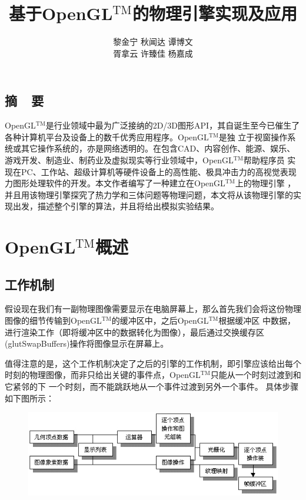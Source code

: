 ﻿\documentclass{article}
\newcommand{\kai}{\CJKfamily{KaiTi}}
\renewenvironment{abstract}{
\subsection*{\textbf{摘~~要}}
\kai
}{}
\begin{document}
	\title{\textbf{基于OpenGL$^{\text{TM}}$的物理引擎实现及应用}}
	\author{黎金宁\,\,秋闻达\,\,谭博文\\胥拿云\,\,许臻佳\,\,杨嘉成}
	\maketitle
	\begin{abstract}
		OpenGL$^{\text{TM}}$是行业领域中最为广泛接纳的2D/3D图形API\cite{ref2}，其自诞生至今已催生了各种计算机平台及设备上的数千优秀应用程序。OpenGL$^{\text{TM}}$是独
		立于视窗操作系统或其它操作系统的，亦是网络透明的。在包含CAD、内容创作、能源、娱乐、游戏开发、制造业、制药业及虚拟现实等行业领域中，OpenGL$^{\text{TM}}$帮助程序员
		实现在PC、工作站、超级计算机等硬件设备上的高性能、极具冲击力的高视觉表现力图形处理软件的开发。本文作者编写了一种建立在OpenGL$^{\text{TM}}$上的物理引擎
		\cite{ref1}，并且用该物理引擎探究了热力学和三体问题等物理问题，本文将从该物理引擎的实现出发，描述整个引擎的算法，并且将给出模拟实验结果。
	\end{abstract}
	\tableofcontents
	\newpage
	\section{OpenGL$^{\text{TM}}$概述}
	\subsection{工作机制}
	\indent 假设现在我们有一副物理图像需要显示在电脑屏幕上，那么首先我们会将这份物理图像的细节传输到OpenGL$^{\text{TM}}$的缓冲区中，之后OpenGL$^{\text{TM}}$根据缓冲区
	中数据，进行渲染工作（即将缓冲区中的数据转化为图像），最后通过交换缓存区(glutSwapBuffers)操作将图像显示在屏幕上。\par
	值得注意的是，这个工作机制决定了之后的引擎的工作机制，即引擎应该给出每个时刻的物理图像，而非只给出关键的事件点，OpenGL$^{\text{TM}}$只能从一个时刻过渡到和它紧邻的下
	一个时刻，而不能跳跃地从一个事件过渡到另外一个事件。
	具体步骤如下图所示：
	\begin{figure}[!htbp]
		\centering
		\includegraphics[width=15.5cm]{graph1.jpg}
	\end{figure}
\end{document}
